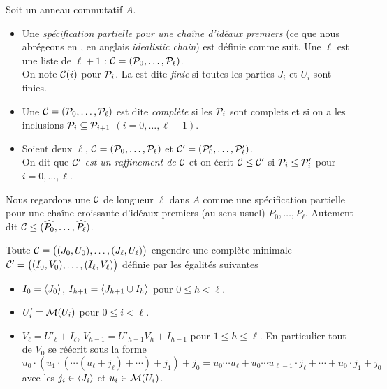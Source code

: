 \begin{definition}{\rm  
\label{defproch1} Soit un anneau commutatif $A$. 
\begin{itemize}
%
\item 
Une \emph{spécification partielle pour une chaîne  d'idéaux 
premiers} (ce que nous abrégeons en {\em \proc}, en anglais {\em 
idealistic chain}) est définie comme suit. Une {\em \prolo $\ell$}  est 
une liste de $\ell+1$ \prois:  ${\cal C}=({\cal P}_0,\ldots,{\cal P}_\ell)$. \\
On note ${\cal C}(i)$ pour ${\cal P}_i$. La \proc est dite 
{\em finie}  si toutes les parties $J_i$ et $U_i$ sont finies. 
%
\item  
Une \proc ${\cal C}=({\cal P}_0,\ldots,{\cal P}_\ell)$ est dite {\em complète} si les 
\prois ${\cal P}_i$ sont complets et si on a les inclusions ${\cal P}_i\subseteq 
{\cal P}_{i+1}$ $(i=0,\ldots ,\ell-1)$. 
%
\item   
Soient deux \prolos $\ell$, ${\cal C}=({\cal P}_0,\ldots,{\cal P}_\ell)$ et
${\cal C}'=({\cal P}'_0,\ldots,{\cal P}'_\ell)$. \\
On dit que {\em ${\cal C}'$ est un 
raffinement de ${\cal C}$} et on écrit 
${\cal C}\leq {\cal C}'$ si ${\cal P}_i\leq {\cal P}'_i$ pour $i=0,\ldots ,\ell$. 
%
\end{itemize}
}
\end{definition}
Nous regardons une \proc ${\cal C}$ de longueur $\ell$  dans $A$ comme une 
spécification partielle pour une chaîne croissante d'idéaux 
premiers
(au sens usuel)  $P_0,\ldots,P_\ell$. Autement dit  
${\cal C}\leq (\widehat{P_0},\ldots, \widehat{P_\ell})$. 
 
\begin{lemma} 
\label{factProcComp} 
Toute \proc ${\cal C}=\big((J_0,U_0),\ldots,(J_\ell,U_\ell)\big)$ engendre une \proc 
complète minimale ${\cal C}'=\big((I_0,V_0),\ldots,(I_\ell,V_\ell)\big) $  
définie par les égalités suivantes
\begin{itemize}
%
\item $ I_0=\left\langle{J_0}\right\rangle$, $ I_{h+1}=\left\langle{J_{h+1}\cup I_h}\right\rangle$ pour $0\leq h<\ell$.
%
\item  $U'_i={\cal M}(U_i)$ pour $0\leq i<\ell$. 
%
\item   $V_\ell=U'_\ell+I_\ell$,   $V_{h-1} = U'_{h-1} V_h + I_{h-1}$ pour $1\leq h\leq \ell$. En particulier tout \elt de $V_0$ se réécrit sous la forme
$$u_0\cdot(u_1\cdot(\cdots(u_\ell+j_\ell)+\cdots)+j_1)+j_0=u_0\cdots 
u_\ell+
u_0\cdots u_{\ell-1}\cdot j_\ell+\cdots+u_0\cdot j_1+j_0 
$$
avec les $j_i\in \left\langle{J_i}\right\rangle$ et $u_i\in{\cal M}(U_i)$. 
\end{itemize}
\end{lemma}



